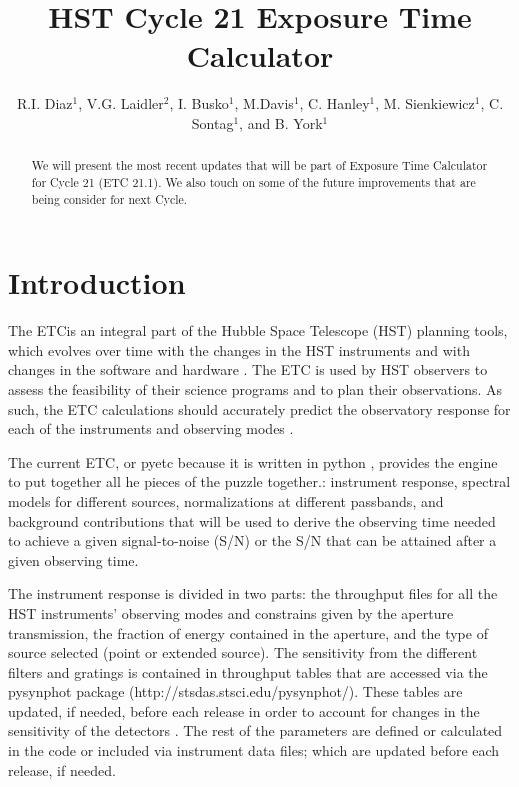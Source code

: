 \documentclass[11pt,twoside]{article}
\begin{document}
\title{HST Cycle 21 Exposure Time Calculator}
\author{R.I. Diaz$^1$, V.G. Laidler$^2$, I. Busko$^1$, M.Davis$^1$, C. Hanley$^1$, M. Sienkiewicz$^1$, C. Sontag$^1$, and B. York$^1$
}

\begin{abstract}
We will present the most recent updates that will be part of Exposure Time Calculator for 
Cycle 21 (ETC 21.1). We also touch on 
some of the future improvements that are being consider for next Cycle. 
\end{abstract}

\section{Introduction}
The ETCis an integral part of the  Hubble Space Telescope (HST) planning tools, which
evolves over time with the changes in the HST
instruments and with changes in the software and hardware \citep{Diaz3_2010, Diazetal_2010}.
The ETC is used by HST observers
to assess the feasibility of their science programs and to plan their observations.
As such, the ETC calculations should accurately predict the observatory response
for each of the instruments and observing modes \citep{Diaz_2012}.

The current ETC, or pyetc because it is written in python \citep{pyetc2010}, provides the engine to
put together all he pieces of the puzzle together.: instrument response, spectral models for different
sources, normalizations at different passbands, and background contributions that will be used to derive
the observing time needed to achieve a given signal-to-noise (S/N) or the S/N that can be attained after
a given observing time.

The instrument response is divided in two parts: the throughput files for all the HST instruments'
observing modes  and constrains given by  the aperture
transmission, the  fraction of energy contained in the aperture, and the type of source selected (point or extended source).
The sensitivity from the different filters and gratings is contained in throughput tables
that are accessed via the pysynphot package (http://stsdas.stsci.edu/pysynphot/). These tables are updated, if needed,
before each release in order to account for changes in the sensitivity of the detectors \citep{cdbs_2012}.
The rest of the parameters are defined or calculated in the code or included via instrument data files;
which are updated before each release, if needed.
\end{document}
